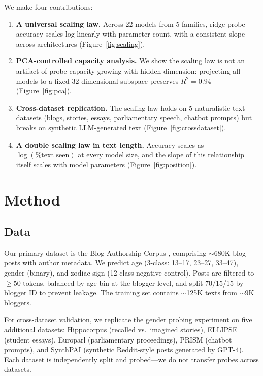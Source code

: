 \documentclass{article}
\begin{document}
We make four contributions:
\begin{enumerate}
    \item \textbf{A universal scaling law.} Across 22 models from 5 families, ridge probe accuracy scales log-linearly with parameter count, with a consistent slope across architectures (Figure~\ref{fig:scaling}).
    \item \textbf{PCA-controlled capacity analysis.} We show the scaling law is not an artifact of probe capacity growing with hidden dimension: projecting all models to a fixed 32-dimensional subspace preserves $R^2\!=\!0.94$ (Figure~\ref{fig:pca}).
    \item \textbf{Cross-dataset replication.} The scaling law holds on 5 naturalistic text datasets (blogs, stories, essays, parliamentary speech, chatbot prompts) but breaks on synthetic LLM-generated text (Figure~\ref{fig:crossdataset}).
    \item \textbf{A double scaling law in text length.} Accuracy scales as $\log(\text{\% text seen})$ at every model size, and the slope of this relationship itself scales with model parameters (Figure~\ref{fig:position}).
\end{enumerate}

\section{Method}

\subsection{Data}

Our primary dataset is the Blog Authorship Corpus \citep{schler2006effects}, comprising $\sim$680K blog posts with author metadata. We predict age (3-class: 13--17, 23--27, 33--47), gender (binary), and zodiac sign (12-class negative control). Posts are filtered to $\geq\!50$ tokens, balanced by age bin at the blogger level, and split 70/15/15 by blogger ID to prevent leakage. The training set contains $\sim$125K texts from $\sim$9K bloggers.

For cross-dataset validation, we replicate the gender probing experiment on five additional datasets: Hippocorpus (recalled vs.\ imagined stories), ELLIPSE (student essays), Europarl (parliamentary proceedings), PRISM (chatbot prompts), and SynthPAI (synthetic Reddit-style posts generated by GPT-4). Each dataset is independently split and probed---we do not transfer probes across datasets.
\end{document}
